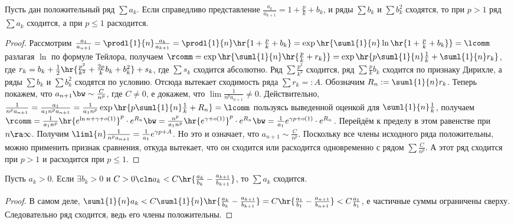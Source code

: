 \documentclass[a4paper]{article}
\begin{document}
\begin{theorem}
Пусть дан положительный ряд $\sum a_k$. Если справедливо представление $\frac{a_k}{a_{k+1}}=1+\frac{p}{k} + b_k$,
и ряды $\sum b_k$ и $\sum b_k^2$ сходятся, то при $p > 1$ ряд $\sum a_k$ сходится, а при $p \le 1$ расходится.
\end{theorem}
\begin{proof}
Рассмотрим $\frac{a_1}{a_{n+1}}= \prodl{1}{n} \frac{a_k}{a_{k+1}} = \prodl{1}{n}\hr{ 1+\frac{p}{k} + b_k } =
\exp \hr{ \suml{1}{n} \ln \hr{ 1 + \frac{p}{k} + b_k }} = \lcomm$ разлагая $\ln$ по формуле Тейлора, получаем $\rcomm =
\exp \hr{ \suml{1}{n} \hr{ \frac{p}{k} + r_k }} = \exp \hr{ p\suml{1}{n} \frac{1}{k} + \suml{1}{n} r_k }$, где
$r_k = b_k + \frac{1}{2}\hr{\frac{p^2}{k^2} + \frac{2p}{k}b_k + b_k^2} + s_k$, где $\sum s_k$ сходится абсолютно. Ряд $\sum \frac{p^2}{k^2}$ сходится, ряд $\sum \frac{p}{k}b_k$ сходится по
признаку Дирихле, а ряды $\sum b_k$ и $\sum b_k^2$ сходятся по условию. Отсюда вытекает сходимость ряда $\sum r_k =: A$.
Обозначим $R_n := \suml{1}{n}r_k$.
Теперь покажем, что $a_{n+1} \bw\sim \frac{C}{n^p}$, где $C \neq 0$, е докажем, что $\lim \frac{1}{n^pa_{n+1}} \neq 0$. Действительно,
$\frac{1}{n^p a_{n+1}}=\frac{a_1}{a_1n^p a_{n+1}}=\frac{1}{a_1n^p} \exp \hr{p\suml{1}{n}\frac{1}{k} + R_n} = \lcomm$
пользуясь выведенной оценкой для $\suml{1}{n} \frac{1}{k}$, получаем
$\rcomm = \frac{1}{a_1n^p}\hr{e^{\ln n + \gamma + o(1)}}^p \cdot e^{R_n} \bw= \frac{n^p}{a_1n^p} \hr{ e^{\gamma + o(1)}}^p
\cdot e^{R_n}\bw=\frac{1}{a_1}e^{\gamma p + o(1)}\cdot e^{R_n}$. Перейдём к пределу в этом равенстве при $n \ra \infty$. Получим
$\liml{n} \frac{1}{n^pa_{n+1}}= \frac{1}{a_1}e^{\gamma p+A}$. Но это и означает, что $a_{n+1} \sim \frac{C}{n^p}$. Поскольку все члены исходного ряда
положительны, можно применить признак сравнения, откуда вытекает, что он сходится или расходится одновременно с рядом $\sum \frac{C}{n^p}$.
А этот ряд сходится при $p > 1$ и расходится при $p \le 1$.
\end{proof}

\begin{theorem}
Пусть $a_k>0$. Если $\exi b_k>0$ и $C>0\cln a_k < C\hr{ \frac{a_k}{b_k}-\frac{a_{k+1}}{b_{k+1}}}$,
то $\sum a_k$ сходится.
\end{theorem}
\begin{proof}
В самом деле, $\suml{1}{n} a_k < C \suml{1}{n}\hr{ \frac{a_k}{b_k}-\frac{a_{k+1}}{b_{k+1}}} = C\hr{ \frac{a_1}{b_1}-\frac{a_{n+1}}{b_{n+1}}}
< C\frac{a_1}{b_1}$, е частичные суммы ограничены сверху. Следовательно ряд сходится, ведь его члены положительны.
\end{proof}
\end{document}
